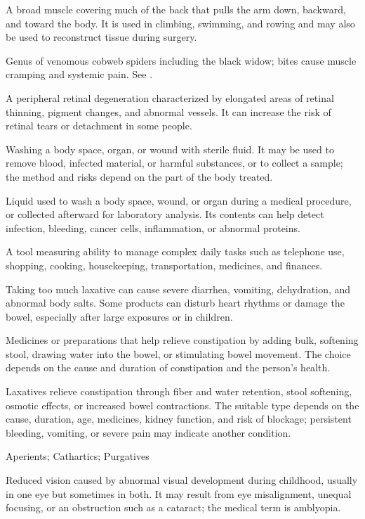  A broad muscle covering much of the back that pulls the arm down, backward, and toward the body. It is used in climbing, swimming, and rowing and may also be used to reconstruct tissue during surgery.

 Genus of venomous cobweb spiders including the black widow; bites cause muscle cramping and systemic pain. See .

 A peripheral retinal degeneration characterized by elongated areas of retinal thinning, pigment changes, and abnormal vessels. It can increase the risk of retinal tears or detachment in some people.

 Washing a body space, organ, or wound with sterile fluid. It may be used to remove blood, infected material, or harmful substances, or to collect a sample; the method and risks depend on the part of the body treated.

 Liquid used to wash a body space, wound, or organ during a medical procedure, or collected afterward for laboratory analysis. Its contents can help detect infection, bleeding, cancer cells, inflammation, or abnormal proteins.

 A tool measuring ability to manage complex daily tasks such as telephone use, shopping, cooking, housekeeping, transportation, medicines, and finances.

 Taking too much laxative can cause severe diarrhea, vomiting, dehydration, and abnormal body salts. Some products can disturb heart rhythms or damage the bowel, especially after large exposures or in children.

 Medicines or preparations that help relieve constipation by adding bulk, softening stool, drawing water into the bowel, or stimulating bowel movement. The choice depends on the cause and duration of constipation and the person's health.

 Laxatives relieve constipation through fiber and water retention, stool softening, osmotic effects, or increased bowel contractions. The suitable type depends on the cause, duration, age, medicines, kidney function, and risk of blockage; persistent bleeding, vomiting, or severe pain may indicate another condition.

\synonyms
Aperients; Cathartics; Purgatives

 Reduced vision caused by abnormal visual development during childhood, usually in one eye but sometimes in both. It may result from eye misalignment, unequal focusing, or an obstruction such as a cataract; the medical term is amblyopia.

